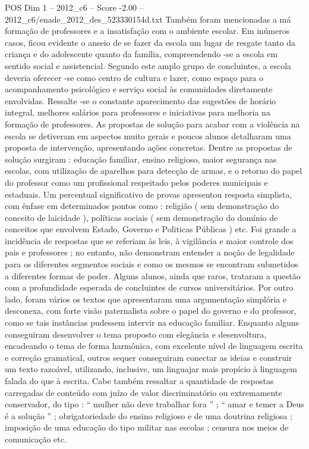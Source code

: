 \begin{textsample}{POS Dim 1 – 2012\_c6 – Score -2.00 – 2012\_c6/enade\_2012\_des\_523330154d.txt}
Também foram mencionadas a má formação de professores e a insatisfação com o ambiente escolar.
Em inúmeros casos, ficou evidente o anseio de se fazer da escola um lugar de resgate tanto da criança e do adolescente quanto da família, compreendendo -se a escola em sentido social e assistencial.
Segundo este amplo grupo de concluintes, a escola deveria oferecer -se como centro de cultura e lazer, como espaço para o acompanhamento psicológico e serviço social às comunidades diretamente envolvidas.
Ressalte -se o constante aparecimento das sugestões de horário integral, melhores salários para professores e iniciativas para melhoria na formação de professores.
As propostas de solução para acabar com a violência na escola se detiveram em aspectos muito gerais e poucos alunos detalharam uma proposta de intervenção, apresentando ações concretas.
Dentre as propostas de solução surgiram : educação familiar, ensino religioso, maior segurança nas escolas, com utilização de aparelhos para detecção de armas, e o retorno do papel do professor como um profissional respeitado pelos poderes municipais e estaduais.
Um percentual significativo de provas apresentou resposta simplista, com ênfase em determinados pontos como : religião ( sem demonstração do conceito de laicidade ), políticas sociais ( sem demonstração do domínio de conceitos que envolvem Estado, Governo e Politicas Públicas ) etc.
Foi grande a incidência de respostas que se referiam às leis, à vigilância e maior controle dos pais e professores ; no entanto, não demonstram entender a noção de legalidade para os diferentes segmentos sociais e como os mesmos se encontram submetidos a diferentes formas de poder.
Alguns alunos, ainda que raros, trataram a questão com a profundidade esperada de concluintes de cursos universitários.
Por outro lado, foram vários os textos que apresentaram uma argumentação simplória e desconexa, com forte visão paternalista sobre o papel do governo e do professor, como se tais instâncias pudessem intervir na educação familiar.
Enquanto alguns conseguiram desenvolver o tema proposto com elegância e desenvoltura, encadeando o tema de forma harmônica, com excelente nível de linguagem escrita e correção gramatical, outros sequer conseguiram conectar as ideias e construir um texto razoável, utilizando, inclusive, um linguajar mais propício à linguagem falada do que à escrita.
Cabe também ressaltar a quantidade de respostas carregadas de conteúdo com juízo de valor discriminatório ou extremamente conservador, do tipo : “ mulher não deve trabalhar fora ” ; “ amar e temer a Deus é a solução ” ; obrigatoriedade do ensino religioso e de uma doutrina religiosa ; imposição de uma educação do tipo militar nas escolas ; censura nos meios de comunicação etc.

\end{textsample}
